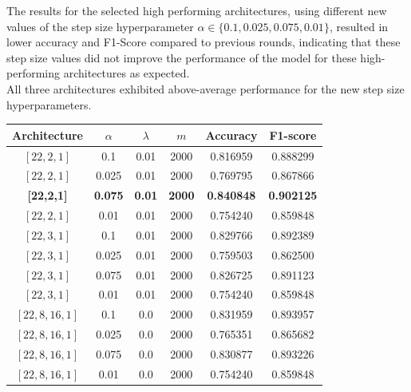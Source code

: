\documentclass{article}
\begin{document}
\begin{enumerate}
The results for the selected high performing architectures, using different new values of the step size hyperparameter $\alpha \in \{0.1, 0.025, 0.075, 0.01\}$, resulted in lower accuracy and F1-Score compared to previous rounds, indicating that these step size values did not improve the performance of the model for these high-performing architectures as expected.\\

All three architectures exhibited above-average performance for the new step size hyperparameters.


\begin{table}[H]
\centering
\large
\renewcommand{\arraystretch}{1.3}
\setlength{\tabcolsep}{8pt}

\begin{tabular}{|c|c|c|c|c|c|}
\hline
\textbf{Architecture} & \textbf{$\alpha$} & \textbf{$\lambda$} & \textbf{$m$} & \textbf{Accuracy} & \textbf{F1-score} \\
\hline

$[22,2,1]$ & 0.1   & 0.01 & 2000 & 0.816959 & 0.888299 \\ \hline
$[22,2,1]$ & 0.025 & 0.01 & 2000 & 0.769795 & 0.867866 \\ \hline
\textbf{[22,2,1]} & \textbf{0.075} & \textbf{0.01} & \textbf{2000} & \textbf{0.840848} & \textbf{0.902125} \\ \hline
$[22,2,1]$ & 0.01  & 0.01 & 2000 & 0.754240 & 0.859848 \\ \hline

$[22,3,1]$ & 0.1   & 0.01 & 2000 & 0.829766 & 0.892389 \\ \hline
$[22,3,1]$ & 0.025 & 0.01 & 2000 & 0.759503 & 0.862500 \\ \hline
$[22,3,1]$ & 0.075 & 0.01 & 2000 & 0.826725 & 0.891123 \\ \hline
$[22,3,1]$ & 0.01  & 0.01 & 2000 & 0.754240 & 0.859848 \\ \hline

$[22,8,16,1]$ & 0.1   & 0.0 & 2000 & 0.831959 & 0.893957 \\ \hline
$[22,8,16,1]$ & 0.025 & 0.0 & 2000 & 0.765351 & 0.865682 \\ \hline
$[22,8,16,1]$ & 0.075 & 0.0 & 2000 & 0.830877 & 0.893226 \\ \hline
$[22,8,16,1]$ & 0.01  & 0.0 & 2000 & 0.754240 & 0.859848 \\ \hline

\end{tabular}


\end{table}
\end{enumerate}
\end{document}
